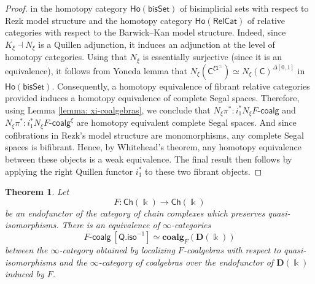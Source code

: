 \documentclass[a4paper,12pt]{amsart}
\newcommand{\ho}[1]{\mathsf{Ho}(#1)}
\theoremstyle{plain}
\newtheorem{theorem}{Theorem}[section]
\theoremstyle{definition}
\theoremstyle{remark}
\newcommand{\kk}{\Bbbk}
\begin{document}
\begin{proof}
in the homotopy category $\ho{\mathsf{bisSet}}$ of bisimplicial sets with respect to Rezk model structure and the homotopy category $\ho{\mathsf{RelCat}}$ of relative categories with respect to the Barwick--Kan model structure. Indeed, since $K_\xi \dashv N_\xi$ is a Quillen adjunction, it induces an adjunction at the level of homotopy categories. Using that $N_\xi$ is essentially surjective (since it is an equivalence), it follows from Yoneda lemma that $N_{\xi}(\mathsf{C}^{\xi\mathsf{1}^{\simeq}}) \simeq N_{\xi}(\mathsf{C})^{\Delta[0,1]}$ in $\ho{\mathsf{bisSet}}$. Consequently, a homotopy equivalence of fibrant relative categories provided induces a homotopy equivalence of complete Segal spaces. Therefore, using Lemma \ref{lemma: xi-coalgebras}, we conclude that $N_{\xi}\pi^*:i_1^*N_{\xi}F\text{-}\mathsf{coalg}$ and $N_{\xi}\pi^*:i_1^*N_{\xi}F\text{-}\mathsf{coalg}^{\xi}$ are homotopy equivalent complete Segal spaces. And since cofibrations in Rezk's model structure are monomorphisms, any complete Segal spaces is bifibrant. Hence, by Whitehead's theorem, any homotopy equivalence between these objects is a  weak equivalence. The final result then follows by applying the right Quillen functor $i_1^*$ to these two fibrant objects. 
\end{proof}

\begin{theorem}\label{thm: rectification of coalgebras over an endofunctor}
Let 
\[
F: \mathsf{Ch}(\kk) \longrightarrow \mathsf{Ch}(\kk)
\]
be an endofunctor of the category of chain complexes which preserves quasi-isomorphisms. There is an equivalence of 
$\infty$-categories
\[
F\text{-}\mathsf{coalg}~[\mathsf{Q.iso}^{-1}] \simeq \mathbf{coalg}_{F}(\mathbf{D}(\kk))
\]
between the $\infty$-category obtained by localizing $F$-coalgebras with respect to quasi-isomorphisms and the $\infty$-category of coalgebras over the endofunctor of $\mathbf{D}(\kk)$ induced by $F$. 
\end{theorem}
\end{document}
